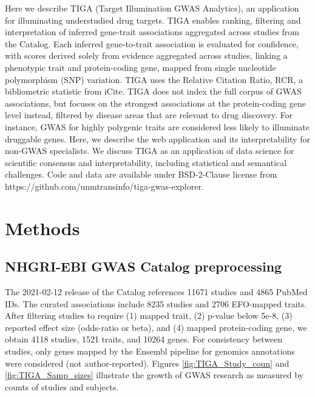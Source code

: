 Here we describe TIGA (Target Illumination GWAS Analytics), an application for illuminating understudied drug targets. TIGA enables ranking, filtering and interpretation of inferred gene-trait associations aggregated across studies from the Catalog. Each inferred gene-to-trait association is evaluated for confidence, with scores derived solely from evidence aggregated across studies, linking a phenotypic trait and protein-coding gene, mapped from single nucleotide polymorphism (SNP) variation. TIGA uses the Relative Citation Ratio, RCR\cite{Hutchins2016-hs}, a bibliometric statistic from iCite\cite{Hutchins2019-ue}. TIGA does not index the full corpus of GWAS associations, but focuses on the strongest associations at the protein-coding gene level instead, filtered by disease areas that are relevant to drug discovery. For instance, GWAS for highly polygenic traits are considered less likely to illuminate druggable genes. Here, we describe the web application and its interpretability for non-GWAS specialists. We discuss TIGA as an application of data science for scientific consensus and interpretability, including statistical and semantical challenges. Code and data are available under BSD-2-Clause license from https://github.com/unmtransinfo/tiga-gwas-explorer.

\section{Methods}

\subsection{NHGRI-EBI GWAS Catalog preprocessing}

The 2021-02-12 release of the Catalog references 11671 studies and 4865 PubMed IDs. The curated associations include 8235 studies and 2706 EFO-mapped traits. After filtering studies to require (1) mapped trait, (2) p-value below 5e-8, (3) reported effect size (odds-ratio or beta), and (4) mapped protein-coding gene, we obtain 4118 studies, 1521 traits, and 10264 genes. For consistency between studies, only genes mapped by the Ensembl pipeline for genomics annotations were considered (not author-reported). Figures \ref{fig:TIGA_Study_coun} and \ref{fig:TIGA_Samp_sizes} illustrate the growth of GWAS research as measured by counts of studies and subjects.  

